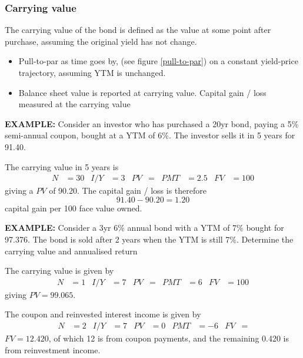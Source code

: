 \documentclass[../notes_compiled.tex]{subfiles}
\begin{document}
\subsubsection{Carrying value}
\begin{itemize}
\item The carrying value of the bond is defined as the value at some point after purchase, assuming the original yield has not change. 
\begin{itemize}
\item Pull-to-par as time goes by, (see figure \ref{pull-to-par}) on a constant yield-price trajectory, assuming YTM is unchanged.
\item Balance sheet value is reported at carrying value. Capital gain / loss measured at the carrying value
\end{itemize}
{\color{RedViolet}
\item[] \textbf{EXAMPLE:} Consider an investor who has purchased a 20yr bond, paying a 5\% semi-annual coupon, bought at a YTM of 6\%. The investor sells it in 5 years for 91.40.
}


{\color{RoyalBlue}
The carrying value in 5 years is 
\begin{align*}
N&=30  & I / Y &= 3 & PV &= & PMT &=2.5 & FV &=100
\end{align*}
giving a $PV$ of 90.20. The capital gain / loss is therefore
\begin{equation*}
91.40 - 90.20 = 1.20
\end{equation*}
capital gain per 100 face value owned.
\item[]
}


{\color{RedViolet}
\item[] \textbf{EXAMPLE:}  Consider a 3yr 6\% annual bond with a YTM of 7\% bought for 97.376. The bond is sold after 2 years when the YTM is still 7\%. Determine the carrying value and annualised return
}


{\color{RoyalBlue}
The carrying value is given by 
\begin{align*}
N&=1  & I / Y &= 7 & PV &= & PMT &=6 & FV &=100
\end{align*}
giving $PV=99.065$.

The coupon and reinvested interest income is given by
\begin{align*}
N&=2  & I / Y &= 7 & PV &=0 & PMT &=-6 & FV &=
\end{align*}
$FV=12.420$, of which 12 is from coupon payments, and the remaining 0.420 is from reinvestment income.

}
\end{itemize}
\end{document}
